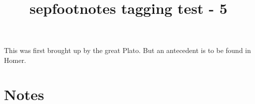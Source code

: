 \documentclass{article}
\title{sepfootnotes tagging test - 5}
\begin{document}
This was first brought up by the great Plato.
But an antecedent is to be found in Homer.
\section*{Notes}
\thexnotes
\end{document}

